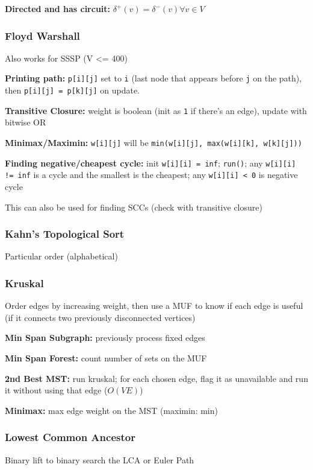 \documentclass[12pt, a4paper, twoside]{article}
\begin{document}
\textbf{Directed and has circuit:} $\delta^{+}(v) = \delta^{-}(v) \forall v \in V$

\subsubsection{Floyd Warshall}
Also works for SSSP (V <= 400)

\textbf{Printing path:} \texttt{p[i][j]} set to \texttt{i} (last node that appears before \texttt{j} on the path), then \texttt{p[i][j] = p[k][j]} on update.

\textbf{Transitive Closure:} weight is boolean (init as \texttt{1} if there's an edge), update with bitwise OR

\textbf{Minimax/Maximin:} \texttt{w[i][j]} will be \texttt{min(w[i][j], max(w[i][k], w[k][j]))}

\textbf{Finding negative/cheapest cycle:} init \texttt{w[i][i] = inf}; \texttt{run()}; any \texttt{w[i][i] != inf} is a cycle and the smallest is the cheapest; any \texttt{w[i][i] < 0} is negative cycle

This can also be used for finding SCCs (check with transitive closure)

\subsubsection{Kahn's Topological Sort}
Particular order (alphabetical)

\subsubsection{Kruskal}
Order edges by increasing weight, then use a MUF to know if each edge is useful (if it connects two previously disconnected vertices)

\textbf{Min Span Subgraph:} previously process fixed edges

\textbf{Min Span Forest:} count number of sets on the MUF

\textbf{2nd Best MST:} run kruskal; for each chosen edge, flag it as unavailable and run it without using that edge ($O(VE)$)

\textbf{Minimax:} max edge weight on the MST (maximin: min)

\subsubsection{Lowest Common Ancestor}
Binary lift to binary search the LCA or Euler Path
\end{document}
